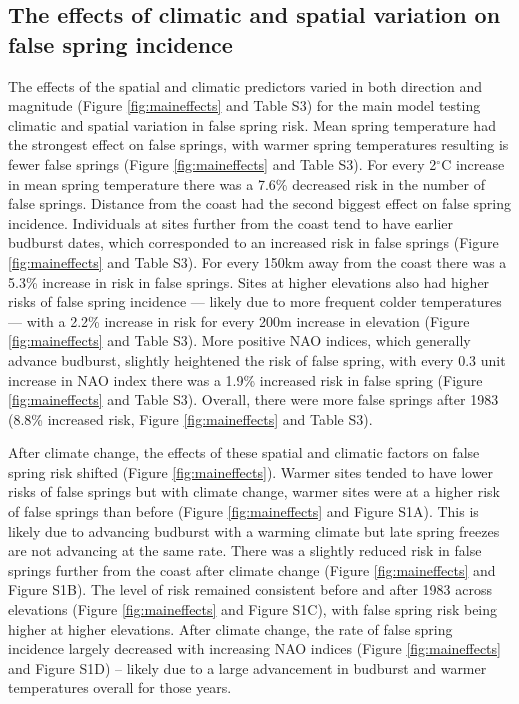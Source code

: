 \documentclass{article}\usepackage[]{graphicx}\usepackage[]{color}
\begin{document}
\subsection*{The effects of climatic and spatial variation on false spring incidence}
The effects of the spatial and climatic predictors varied in both direction and magnitude (Figure \ref{fig:maineffects} and Table S3) for the main model testing climatic and spatial variation in false spring risk. Mean spring temperature had the strongest effect on false springs, with warmer spring temperatures resulting is fewer false springs (Figure \ref{fig:maineffects} and Table S3). For every 2$^{\circ}$C increase in mean spring temperature there was a 7.6\% decreased risk in the number of false springs. Distance from the coast had the second biggest effect on false spring incidence. Individuals at sites further from the coast tend to have earlier budburst dates, which corresponded to an increased risk in false springs (Figure \ref{fig:maineffects} and Table S3). For every 150km away from the coast there was a 5.3\% increase in risk in false springs. Sites at higher elevations also had higher risks of false spring incidence --- likely due to more frequent colder temperatures --- with a 2.2\% increase in risk for every 200m increase in elevation (Figure \ref{fig:maineffects} and Table S3). More positive NAO indices, which generally advance budburst, slightly heightened the risk of false spring, with every 0.3 unit increase in NAO index there was a 1.9\% increased risk in false spring (Figure \ref{fig:maineffects} and Table S3). Overall, there were more false springs after 1983 (8.8\% increased risk, Figure \ref{fig:maineffects} and Table S3). 

After climate change, the effects of these spatial and climatic factors on false spring risk shifted (Figure \ref{fig:maineffects}).
Warmer sites tended to have lower risks of false springs but with climate change, warmer sites were at a higher risk of false springs than before (Figure \ref{fig:maineffects} and Figure S1A). This is likely due to advancing budburst with a warming climate but late spring freezes are not advancing at the same rate. There was a slightly reduced risk in false springs further from the coast after climate change (Figure \ref{fig:maineffects} and Figure S1B). The level of risk remained consistent before and after 1983 across elevations (Figure \ref{fig:maineffects} and Figure S1C), with false spring risk being higher at higher elevations. After climate change, the rate of false spring incidence largely decreased with increasing NAO indices (Figure \ref{fig:maineffects} and Figure S1D) -- likely due to a large advancement in budburst and warmer temperatures overall for those years. 
\end{document}
